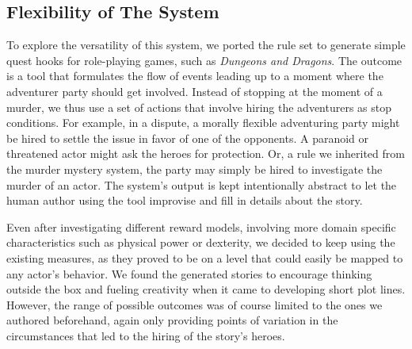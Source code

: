 \subsection{Flexibility of The System}
To explore the versatility of this system, we ported the rule set to generate simple quest hooks for role-playing games, such as \emph{Dungeons and Dragons}.
The outcome is a tool that formulates the flow of events leading up to a moment where the adventurer party should get involved.
Instead of stopping at the moment of a murder, we thus use a set of actions that involve hiring the adventurers as stop conditions.
For example, in a dispute, a morally flexible adventuring party might be hired to settle the issue in favor of one of the opponents.
A paranoid or threatened actor might ask the heroes for protection.
Or, a rule we inherited from the murder mystery system, the party may simply be hired to investigate the murder of an actor.
The system's output is kept intentionally abstract to let the human author using the tool improvise and fill in details about the story.

Even after investigating different reward models, involving more domain specific characteristics such as physical power or dexterity, we decided to keep using the existing measures, as they proved to be on a level that could easily be mapped to any actor's behavior.
We found the generated stories to encourage thinking outside the box and fueling creativity when it came to developing short plot lines.
However, the range of possible outcomes was of course limited to the ones we authored beforehand, again only providing points of variation in the circumstances that led to the hiring of the story's heroes.
